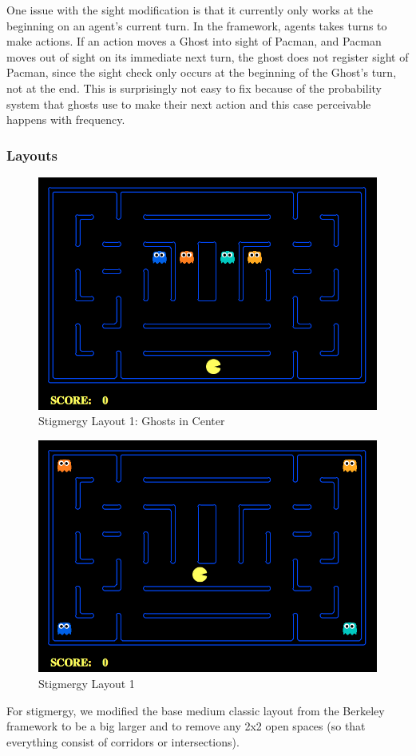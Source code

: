 \documentclass[11pt]{article}
\begin{document}
\begin{multicols}{2}
One issue with the sight modification is that it currently only works at the beginning on an agent's current turn. In the framework, agents takes turns to make actions.  If an action moves a Ghost into sight of Pacman, and Pacman moves out of sight on its immediate next turn, the ghost does not register sight of Pacman, since the sight check only occurs at the beginning of the Ghost's turn, not at the end.  This is surprisingly not easy to fix because of the probability system that ghosts use to make their next action and this case perceivable happens with frequency.

\subsubsection{Layouts}
\begin{figure}[H]
	\includegraphics[width=\columnwidth]{StigmergyClassic1.png}
	\caption{Stigmergy Layout 1: Ghosts in Center}
	\label{fig:stigmap1}
\end{figure}
\begin{figure}[H]
	\includegraphics[width=\columnwidth]{StigmergyClassic2.png}
	\caption{Stigmergy Layout 1}
	\label{fig:stigmap2}
\end{figure}
For stigmergy, we modified the base medium classic layout from the Berkeley framework to be a big larger and to remove any 2x2 open spaces (so that everything consist of corridors or intersections).   


\end{multicols}
\end{document}
